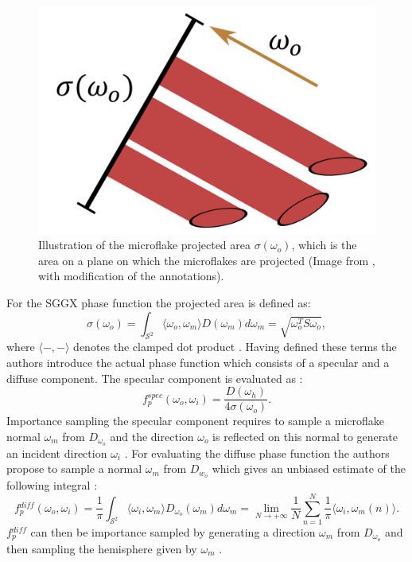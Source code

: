 \begin{figure}[t]
    \centering
    \includegraphics[width=0.3\linewidth]{img/sggx_projected_area.jpg}
    \caption[Illustration of the microflake projected area]{Illustration of the microflake projected area $\sigma(\omega_o)$, which is the area on a plane on which the microflakes are projected (Image from \cite{sggx}, with modification of the annotations).}
    \label{fig:sggx_projected_area}
\end{figure}
For the SGGX phase function the projected area is defined as:
\begin{equation}
    \label{eq:projected_area}
    \sigma(\omega_o)=\int_{\mathcal{S}^2} \langle \omega_o, \omega_m \rangle D(\omega_m) d\omega_m = \sqrt{\omega_o^T S \omega_o},
\end{equation}
where $\langle -,-\rangle$ denotes the clamped dot product \cite{sggx}.
Having defined these terms the authors introduce the actual phase function which consists of a specular and a diffuse component.
The specular component is evaluated as \cite{sggx}:
\begin{equation*}
    f{}^{spec}_p(\omega_o, \omega_i) = \frac{D(\omega_h)}{4 \sigma(\omega_o)}.
\end{equation*}
Importance sampling the specular component requires to sample a microflake normal $\omega_m$ from $D_{\omega_o}$ and the direction $\omega_o$ is reflected on this normal to generate an incident direction $\omega_i$ \cite{sggx}.
For evaluating the diffuse phase function the authors propose to sample a normal $\omega_m$ from $D_{w_o}$ which gives an unbiased estimate of the following integral \cite{sggx}:
\begin{equation*}
    f{}^{diff}_p(\omega_o, \omega_i) = \frac{1}{\pi}\int_{\mathcal{S}^2} \langle\omega_i,\omega_m\rangle D_{\omega_o}(\omega_m) d\omega_m = \lim \limits_{N \to +\infty} \frac{1}{N} \sum_{n=1}^N \frac{1}{\pi} \langle\omega_i,\omega_m(n)\rangle.
\end{equation*}
$f{}^{diff}_p$ can then be importance sampled by generating a direction $\omega_m$ from $D_{\omega_o}$ and then sampling the hemisphere given by $\omega_m$ \cite{sggx}.

